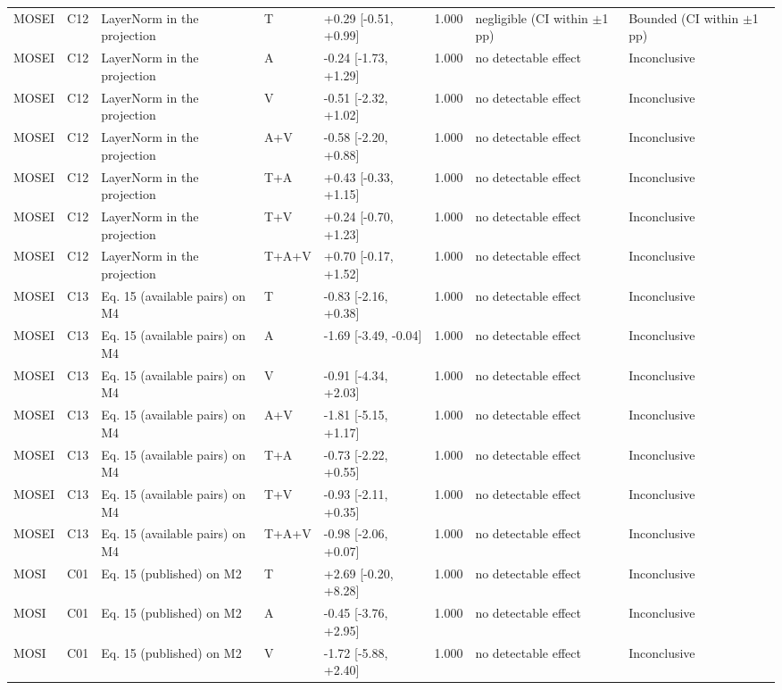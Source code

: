 \begin{landscape}
{\begin{xltabular}{\linewidth}{ll>{\raggedright\arraybackslash}Xlll>{\raggedright\arraybackslash}X>{\raggedright\arraybackslash}X}
MOSEI & C12 & LayerNorm in the projection & T & +0.29 [-0.51, +0.99] & 1.000 & negligible (CI within $\pm$1 pp) & Bounded (CI within $\pm$1 pp) \\
MOSEI & C12 & LayerNorm in the projection & A & -0.24 [-1.73, +1.29] & 1.000 & no detectable effect & Inconclusive \\
MOSEI & C12 & LayerNorm in the projection & V & -0.51 [-2.32, +1.02] & 1.000 & no detectable effect & Inconclusive \\
MOSEI & C12 & LayerNorm in the projection & A+V & -0.58 [-2.20, +0.88] & 1.000 & no detectable effect & Inconclusive \\
MOSEI & C12 & LayerNorm in the projection & T+A & +0.43 [-0.33, +1.15] & 1.000 & no detectable effect & Inconclusive \\
MOSEI & C12 & LayerNorm in the projection & T+V & +0.24 [-0.70, +1.23] & 1.000 & no detectable effect & Inconclusive \\
MOSEI & C12 & LayerNorm in the projection & T+A+V & +0.70 [-0.17, +1.52] & 1.000 & no detectable effect & Inconclusive \\
MOSEI & C13 & Eq. 15 (available pairs) on M4 & T & -0.83 [-2.16, +0.38] & 1.000 & no detectable effect & Inconclusive \\
MOSEI & C13 & Eq. 15 (available pairs) on M4 & A & -1.69 [-3.49, -0.04] & 1.000 & no detectable effect & Inconclusive \\
MOSEI & C13 & Eq. 15 (available pairs) on M4 & V & -0.91 [-4.34, +2.03] & 1.000 & no detectable effect & Inconclusive \\
MOSEI & C13 & Eq. 15 (available pairs) on M4 & A+V & -1.81 [-5.15, +1.17] & 1.000 & no detectable effect & Inconclusive \\
MOSEI & C13 & Eq. 15 (available pairs) on M4 & T+A & -0.73 [-2.22, +0.55] & 1.000 & no detectable effect & Inconclusive \\
MOSEI & C13 & Eq. 15 (available pairs) on M4 & T+V & -0.93 [-2.11, +0.35] & 1.000 & no detectable effect & Inconclusive \\
MOSEI & C13 & Eq. 15 (available pairs) on M4 & T+A+V & -0.98 [-2.06, +0.07] & 1.000 & no detectable effect & Inconclusive \\
MOSI & C01 & Eq. 15 (published) on M2 & T & +2.69 [-0.20, +8.28] & 1.000 & no detectable effect & Inconclusive \\
MOSI & C01 & Eq. 15 (published) on M2 & A & -0.45 [-3.76, +2.95] & 1.000 & no detectable effect & Inconclusive \\
MOSI & C01 & Eq. 15 (published) on M2 & V & -1.72 [-5.88, +2.40] & 1.000 & no detectable effect & Inconclusive \\

\end{xltabular}}
\end{landscape}
